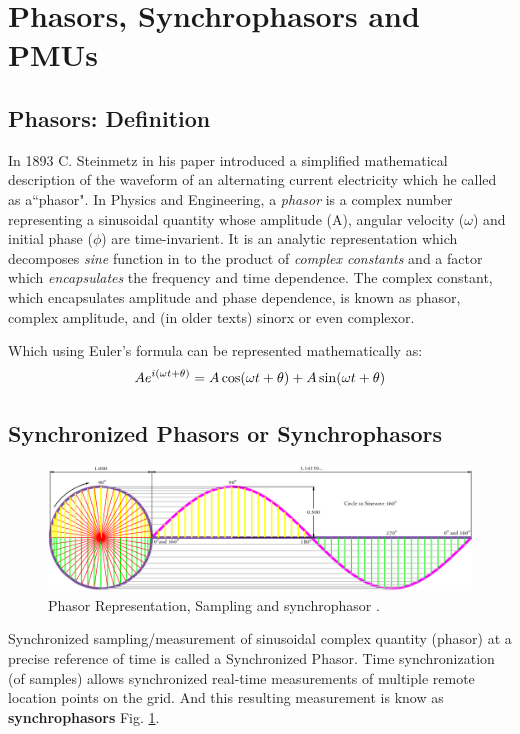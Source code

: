 \section{Phasors, Synchrophasors and PMUs}
\subsection{Phasors: Definition}

In 1893 C. Steinmetz in his paper introduced a simplified mathematical description of the waveform of an alternating current electricity which he called as a``phasor". In Physics and Engineering, a \textit{phasor} is a complex number representing a sinusoidal quantity whose amplitude (A), angular velocity ($\omega$) and initial phase ($\phi$) are time-invarient. It is an analytic representation which decomposes \textit{sine} function in to the product of \textit{complex constants} and a factor which \textit{encapsulates} the frequency and time dependence. The complex constant, which encapsulates amplitude and phase dependence, is known as phasor, complex amplitude, and (in older texts) sinorx or even complexor.

Which using Euler's formula can be represented mathematically as:
\begin{equation}\boldmath
Ae^{i(\omega t + \theta)} = A\cos(\omega t + \theta) + A\sin(\omega t + \theta)
\end{equation}

\subsection{Synchronized Phasors or Synchrophasors}
\begin{figure}
	\includegraphics[width=\textwidth]{fig/Circle-To-Sine-Wave.png}
	\caption{Phasor Representation, Sampling and synchrophasor \cite{CirSinWave} .} 
	\label{fig:CirSin}
\end{figure}
 Synchronized sampling/measurement of sinusoidal complex quantity (phasor) at a precise reference of time is called a Synchronized Phasor. Time synchronization (of samples) allows synchronized real-time measurements of multiple remote location points on the grid. And this resulting measurement is know as \textbf{synchrophasors} Fig. \ref{fig:CirSin}.
